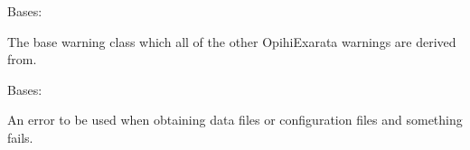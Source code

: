 \documentclass[letterpaper,11pt,english]{sphinxmanual}
\begin{document}

\begin{savenotes}\begin{fulllineitems}
\label{\detokenize{code/opihiexarata.library.error:opihiexarata.library.error.ExarataWarning}}
\pysigstartsignatures
{}
\pysigstopsignatures
\sphinxAtStartPar
Bases: 

\sphinxAtStartPar
The base warning class which all of the other OpihiExarata warnings
are derived from.

\end{fulllineitems}\end{savenotes}


\begin{savenotes}\begin{fulllineitems}
\label{\detokenize{code/opihiexarata.library.error:opihiexarata.library.error.FileError}}
\pysigstartsignatures
{}
\pysigstopsignatures
\sphinxAtStartPar
Bases: {\hyperref[\detokenize{code/opihiexarata.library.error:opihiexarata.library.error.ExarataException}]{}}

\sphinxAtStartPar
An error to be used when obtaining data files or configuration files
and something fails.

\end{fulllineitems}\end{savenotes}

\end{document}
